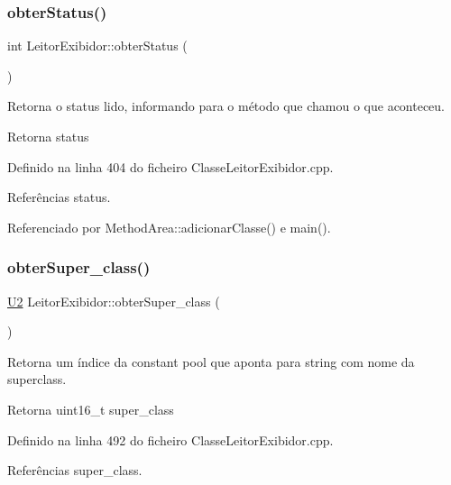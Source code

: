 \subsubsection{\texorpdfstring{obter\+Status()}{obterStatus()}}
{\footnotesize\ttfamily int Leitor\+Exibidor\+::obter\+Status (\begin{DoxyParamCaption}{ }\end{DoxyParamCaption})}



Retorna o status lido, informando para o método que chamou o que aconteceu. 

\begin{DoxyReturn}{Retorna}
status 
\end{DoxyReturn}


Definido na linha 404 do ficheiro Classe\+Leitor\+Exibidor.\+cpp.



Referências status.



Referenciado por Method\+Area\+::adicionar\+Classe() e main().

\mbox{\label{classLeitorExibidor_ab46841a0392f45a35a5444dca234a1ae}} 
\subsubsection{\texorpdfstring{obter\+Super\+\_\+class()}{obterSuper\_class()}}
{\footnotesize\ttfamily \hyperlink{BasicTypes_8h_a90240657108b1b457eef9d3f76e0202e}{U2} Leitor\+Exibidor\+::obter\+Super\+\_\+class (\begin{DoxyParamCaption}{ }\end{DoxyParamCaption})}



Retorna um índice da constant pool que aponta para string com nome da superclass. 

\begin{DoxyReturn}{Retorna}
uint16\+\_\+t super\+\_\+class 
\end{DoxyReturn}


Definido na linha 492 do ficheiro Classe\+Leitor\+Exibidor.\+cpp.



Referências super\+\_\+class.




